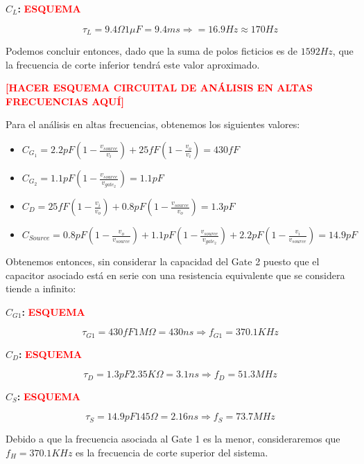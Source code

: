 \documentclass[a4paper, 10pt, spanish]{article}
\begin{document}
\textbf{$C_L$:}
\textbf{\textcolor{red}{ESQUEMA}}

\begin{equation}
  \tau_L = 9.4\Omega 1\mu F = 9.4ms \Rightarrow = 16.9 Hz \approx 170 Hz
\end{equation}

Podemos concluir entonces, dado que la suma de polos ficticios es de $1592Hz$, que la frecuencia de corte inferior tendrá este valor aproximado.

\textcolor{red}{\textbf{[HACER ESQUEMA CIRCUITAL DE ANÁLISIS EN ALTAS FRECUENCIAS AQUÍ]}}

Para el análisis en altas frecuencias, obtenemos los siguientes valores:

\begin{itemize}
  \item $C_{G_1}=2.2pF(1-\frac{v_{source}}{v_i})+25fF(1-\frac{v_o}{v_i}) = 430fF$
  \item $C_{G_2}=1.1pF(1-\frac{v_{source}}{v_{gate_2}}) = 1.1pF$
  \item $C_{D}=25fF(1-\frac{v_i}{v_o})+0.8pF(1-\frac{v_{source}}{v_o}) = 1.3pF$
  \item $C_{Source}=0.8pF(1-\frac{v_o}{v_{source}})+1.1pF(1-\frac{v_{source}}{v_{gate_2}})+2.2pF(1-\frac{v_i}{v_{source}}) = 14.9pF$
\end{itemize}

Obtenemos entonces, sin considerar la capacidad del Gate 2 puesto que el capacitor asociado está en serie con una resistencia equivalente que se considera tiende a infinito:


\textbf{$C_{G1}$:}
\textbf{\textcolor{red}{ESQUEMA}}

\begin{equation}
  \tau_{G1} = 430fF 1M\Omega = 430ns \Rightarrow f_{G1} = 370.1 KHz
\end{equation}


\textbf{$C_{D}$:}
\textbf{\textcolor{red}{ESQUEMA}}

\begin{equation}
  \tau_{D} = 1.3pF 2.35K\Omega = 3.1ns \Rightarrow f_{D} = 51.3 MHz
\end{equation}

\textbf{$C_{S}$:}
\textbf{\textcolor{red}{ESQUEMA}}

\begin{equation}
  \tau_{S} = 14.9 pF 145\Omega = 2.16ns \Rightarrow f_{S} = 73.7 MHz
\end{equation}

Debido a que la frecuencia asociada al Gate 1 es la menor, consideraremos que $f_H=370.1KHz$ es la frecuencia de corte superior del sistema.
\end{document}
